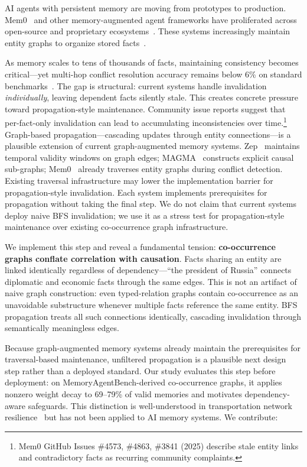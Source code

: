 \documentclass{article}
\begin{document}
AI agents with persistent memory are moving from prototypes to production.
Mem0~\citep{mem0_2024} and other memory-augmented agent frameworks have proliferated across open-source and proprietary ecosystems~\citep{graph_agent_memory_survey_2026}.
These systems increasingly maintain entity graphs to organize stored facts~\citep{mem0_2024, magma_2026, zep_2025}.

As memory scales to tens of thousands of facts, maintaining consistency becomes critical---yet multi-hop conflict resolution accuracy remains below 6\% on standard benchmarks~\citep{memoryagentbench_2026}.
The gap is structural: current systems handle invalidation \textit{individually}, leaving dependent facts silently stale.
This creates concrete pressure toward propagation-style maintenance.
Community issue reports suggest that per-fact-only invalidation can lead to accumulating inconsistencies over time.\footnote{Mem0 GitHub Issues \#4573, \#4863, \#3841 (2025) describe stale entity links and contradictory facts as recurring community complaints.}
Graph-based propagation---cascading updates through entity connections---is a plausible extension of current graph-augmented memory systems.
Zep~\citep{zep_2025} maintains temporal validity windows on graph edges; MAGMA~\citep{magma_2026} constructs explicit causal sub-graphs; Mem0~\citep{mem0_2024} already traverses entity graphs during conflict detection.
Existing traversal infrastructure may lower the implementation barrier for propagation-style invalidation.
Each system implements prerequisites for propagation without taking the final step.
We do not claim that current systems deploy naive BFS invalidation; we use it as a stress test for propagation-style maintenance over existing co-occurrence graph infrastructure.

We implement this step and reveal a fundamental tension: \textbf{co-occurrence graphs conflate correlation with causation}.
Facts sharing an entity are linked identically regardless of dependency---``the president of Russia'' connects diplomatic and economic facts through the same edges.
This is not an artifact of naive graph construction: even typed-relation graphs contain co-occurrence as an unavoidable substructure whenever multiple facts reference the same entity.
BFS propagation treats all such connections identically, cascading invalidation through semantically meaningless edges.

Because graph-augmented memory systems already maintain the prerequisites for traversal-based maintenance, unfiltered propagation is a plausible next design step rather than a deployed standard.
Our study evaluates this step before deployment: on MemoryAgentBench-derived co-occurrence graphs, it applies nonzero weight decay to 69--79\% of valid memories and motivates dependency-aware safeguards.
This distinction is well-understood in transportation network resilience~\citep{chen_network_2007} but has not been applied to AI memory systems.
We contribute:
\end{document}
